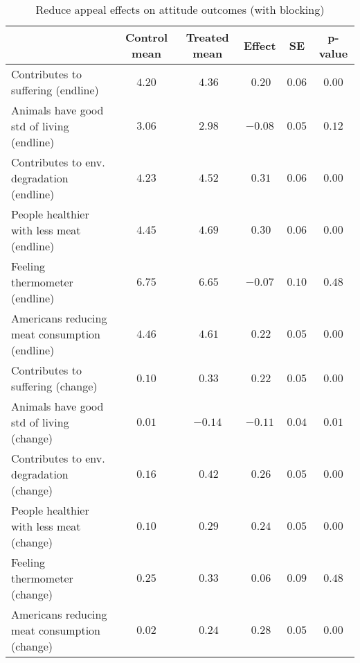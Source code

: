 \begin{table*}[ht]
\caption{Reduce appeal effects on attitude outcomes (with blocking)\label{round}} 
\begin{center}
\begin{tabular}{lccccc}
\hline\hline
\multicolumn{1}{l}{}&\multicolumn{1}{c}{Control mean}&\multicolumn{1}{c}{Treated mean}&\multicolumn{1}{c}{Effect}&\multicolumn{1}{c}{SE}&\multicolumn{1}{c}{p-value}\tabularnewline
\hline
Contributes to suffering (endline)&$4.20$&$~4.36$&$~0.20$&$0.06$&$0.00$\tabularnewline
Animals have good std of living (endline)&$3.06$&$~2.98$&$-0.08$&$0.05$&$0.12$\tabularnewline
Contributes to env. degradation (endline)&$4.23$&$~4.52$&$~0.31$&$0.06$&$0.00$\tabularnewline
People healthier with less meat (endline)&$4.45$&$~4.69$&$~0.30$&$0.06$&$0.00$\tabularnewline
Feeling thermometer (endline)&$6.75$&$~6.65$&$-0.07$&$0.10$&$0.48$\tabularnewline
Americans reducing meat consumption (endline)&$4.46$&$~4.61$&$~0.22$&$0.05$&$0.00$\tabularnewline
Contributes to suffering (change)&$0.10$&$~0.33$&$~0.22$&$0.05$&$0.00$\tabularnewline
Animals have good std of living (change)&$0.01$&$-0.14$&$-0.11$&$0.04$&$0.01$\tabularnewline
Contributes to env. degradation (change)&$0.16$&$~0.42$&$~0.26$&$0.05$&$0.00$\tabularnewline
People healthier with less meat (change)&$0.10$&$~0.29$&$~0.24$&$0.05$&$0.00$\tabularnewline
Feeling thermometer (change)&$0.25$&$~0.33$&$~0.06$&$0.09$&$0.48$\tabularnewline
Americans reducing meat consumption (change)&$0.02$&$~0.24$&$~0.28$&$0.05$&$0.00$\tabularnewline
\hline
\end{tabular}\end{center}

\end{table*}

